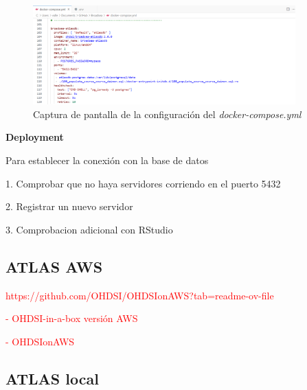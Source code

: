 \documentclass{article}
\begin{document}
\begin{figure}[H]
    \centering
    \includegraphics[width=0.90\textwidth]{images/dockerComposeDB.png}
     \caption{Captura de pantalla de la configuración del \textit{docker-compose.yml}}
    \label{fig:dockerComposeDB}
\end{figure}


\textbf{Deployment}

Para establecer la conexión con la base de datos

1. Comprobar que no haya servidores corriendo en el puerto 5432

2. Registrar un nuevo servidor

3. Comprobacion adicional con RStudio



















\newpage
\subsection{ATLAS AWS}\label{cap:AtlasAWS}

\textcolor{red}{https://github.com/OHDSI/OHDSIonAWS?tab=readme-ov-file}

\textcolor{red}{- OHDSI-in-a-box versión AWS}

\textcolor{red}{- OHDSIonAWS}


\subsection{ATLAS local} \label{cap:ATLASlocal}
\end{document}
